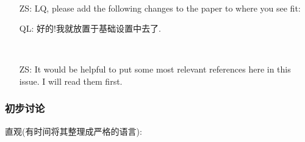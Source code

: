 \documentclass[a4paper,oneside]{ctexbook}
\begin{document}
	\begin{iss}[Open] ~
        \begin{itemize}
        \item[ZS:]
          LQ, please add the following changes to the paper to where you see fit:
        \item[QL:]
        	好的!我就放置于基础设置中去了.
        \end{itemize}
      \end{iss}


      \begin{iss}[Open]~
        \begin{itemize}
        \item[ZS:]
It would be helpful to put some most relevant references here in this issue.
I will read them first.
        \end{itemize}
      \end{iss}

		\subsubsection*{初步讨论}

			直观(有时间将其整理成严格的语言):
\end{document}
